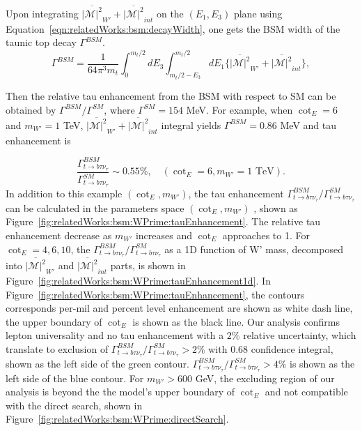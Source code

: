 Upon integrating  $\overline{ |\mathcal{M}|^2 } _{W'} +  \overline{ |\mathcal{M}|^2 } _{int}$ on the $(E_1,E_3)$ plane using Equation~\ref{eqn:relatedWorks:bsm:decayWidth}, one gets the BSM width of the taunic top decay $\Gamma^{BSM}$. 
\begin{equation}
	\Gamma^{BSM} = \frac{1}{64 \pi^3 m_t} \int_{0}^{m_t/2} dE_3 \int_{m_t/2-E_3}^{m_t/2} dE_1  \bigg\{ \overline{ |\mathcal{M}|^2 } _{W'} +  \overline{ |\mathcal{M}|^2}_{int}  \bigg \},
\end{equation}


\noindent Then the relative tau enhancement from the BSM with respect to SM can be obtained by $\Gamma^{BSM}/ \Gamma^{SM}$, where $\Gamma^{SM}=154$ MeV. For example, when $\cot_E=6$  and $m_{W'}=1$ TeV, $\overline{ |\mathcal{M}|^2 } _{W'} +  \overline{ |\mathcal{M}|^2 } _{int}$ integral yields $\Gamma^{BSM} = 0.86 $ MeV and tau enhancement is

\begin{equation}
	\frac{ \Gamma_{t\to b \tau \nu_\tau}^{BSM} }{ \Gamma_{t\to b \tau \nu_\tau}^{SM} } \sim 0.55 \%, \quad (\cot_E=6, m_{W'}=1 \text{ TeV}).
\end{equation}
\noindent In addition to this example $(\cot_E, m_{W'})$, the tau enhancement $ \Gamma_{t\to b \tau \nu_\tau}^{BSM} / \Gamma_{t\to b \tau \nu_\tau}^{SM} $ can be calculated in the  parameters space $(\cot_E, m_{W'})$ , shown as Figure~\ref{fig:relatedWorks:bsm:WPrime:tauEnhancement}. The relative tau enhancement decrease as $m_{W'}$ increases and $\cot_E$ approaches to 1. For $\cot_E=4,6,10$, the $\Gamma_{t\to b \tau \nu_\tau}^{BSM}/  \Gamma_{t\to b \tau \nu_\tau}^{SM} $ as a 1D function of W' mass, decomposed into $\overline{ |\mathcal{M}|^2 } _{W'} $ and $\overline{ |\mathcal{M}|^2 } _{int}$  parts, is shown in Figure~\ref{fig:relatedWorks:bsm:WPrime:tauEnhancement1d}. In Figure~\ref{fig:relatedWorks:bsm:WPrime:tauEnhancement}, the contours corresponds per-mil and percent level enhancement are shown as white dash line, the upper boundary of $\cot_E$ is shown as the black line. Our analysis confirms lepton universality and no tau enhancement with a $2\%$ relative uncertainty, which translate to exclusion of $ \Gamma_{t\to b \tau \nu_\tau}^{BSM} / \Gamma_{t\to b \tau \nu_\tau}^{SM} >  2\%$ with 0.68 confidence integral, shown as the left side of the green contour. $ \Gamma_{t\to b \tau \nu_\tau}^{BSM} / \Gamma_{t\to b \tau \nu_\tau}^{SM} >  4\%$ is shown as the left side of the blue contour. For $m_{W'}>600$ GeV, the excluding region of our analysis is beyond the the model's upper boundary of $\cot_E$ and not compatible with the direct search, shown in Figure~\ref{fig:relatedWorks:bsm:WPrime:directSearch}.




